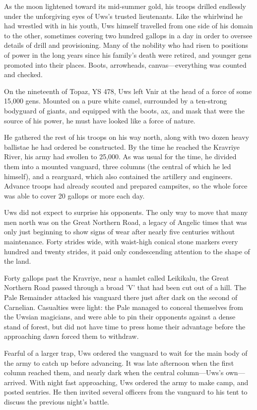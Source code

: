 \documentclass[12pt]{report}
\begin{document}
As the moon lightened toward its mid-summer gold, his troops drilled
endlessly under the unforgiving eyes of Uws's trusted lieutenants.
Like the whirlwind he had wrestled with in his youth, Uws himself
travelled from one side of his domain to the other, sometimes covering
two hundred gallops in a day in order to oversee details of drill and
provisioning.  Many of the nobility who had risen to positions of
power in the long years since his family's death were retired, and
younger gens promoted into their places.  Boots, arrowheads,
canvas---everything was counted and checked.

On the nineteenth of Topaz, YS 478, Uws left Vnir at the head of a
force of some 15,000 gens.  Mounted on a pure white camel, surrounded
by a ten-strong bodyguard of giants, and equipped with the boots, ax,
and mask that were the source of his power, he must have looked like a
force of nature.

He gathered the rest of his troops on his way north, along with two
dozen heavy ballistae he had ordered be constructed.  By the time he
reached the Kravriye River, his army had swollen to 25,000.  As was
usual for the time, he divided them into a mounted vanguard, three
columns (the central of which he led himself), and a rearguard, which
also contained the artillery and engineers.  Advance troops had
already scouted and prepared campsites, so the whole force was able to
cover 20 gallops or more each day.

Uws did not expect to surprise his opponents.  The only way to move
that many men north was on the Great Northern Road, a legacy of
Angelic times that was only just beginning to show signs of wear after
nearly five centuries without maintenance.  Forty strides wide, with
waist-high conical stone markers every hundred and twenty strides, it
paid only condescending attention to the shape of the land.

Forty gallops past the Kravriye, near a hamlet called Leikikalu, the
Great Northern Road passed through a broad 'V' that had been cut out
of a hill.  The Pale Remainder attacked his vanguard there just after
dark on the second of Carnelian.  Casualties were light: the Pale
managed to conceal themselves from the Uwsian magicians, and were able
to pin their opponents against a dense stand of forest, but did not
have time to press home their advantage before the approaching dawn
forced them to withdraw.

Fearful of a larger trap, Uws ordered the vanguard to wait for the
main body of the army to catch up before advancing.  It was late
afternoon when the first column reached them, and nearly dark when the
central column---Uws's own---arrived.  With night fast approaching,
Uws ordered the army to make camp, and posted sentries.  He then
invited several officers from the vanguard to his tent to discuss the
previous night's battle.
\end{document}
